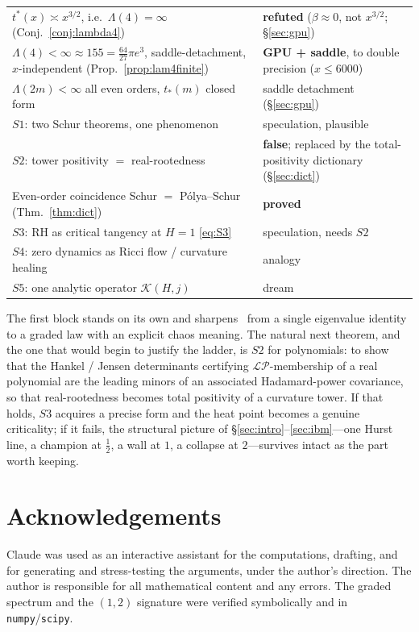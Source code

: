 \documentclass[11pt,reqno]{amsart}
\theoremstyle{plain}
\theoremstyle{definition}
\theoremstyle{remark}
\newcommand{\LP}{\mathcal{LP}}
\begin{document}
\begin{center}
\begin{tabular}{p{}l}
$t^\ast(x)\asymp x^{3/2}$, i.e.\ $\Lambda(4)=\infty$
(Conj.~\ref{conj:lambda4}) & \textbf{refuted} ($\beta\approx0$, not
$x^{3/2}$; \S\ref{sec:gpu})\\
$\Lambda(4)<\infty\approx155=\tfrac{64}{27}\pi e^3$, saddle-detachment,
$x$-independent (Prop.~\ref{prop:lam4finite}) & \textbf{GPU + saddle},
to double precision ($x\le6000$)\\
$\Lambda(2m)<\infty$ all even orders, $t_*(m)$ closed form & saddle
detachment (\S\ref{sec:gpu})\\
$S1$: two Schur theorems, one phenomenon & speculation, plausible\\
$S2$: tower positivity $=$ real-rootedness & \textbf{false}; replaced by
the total-positivity dictionary (\S\ref{sec:dict})\\
Even-order coincidence Schur $=$ P\'olya--Schur (Thm.~\ref{thm:dict}) &
\textbf{proved}\\
$S3$: RH as critical tangency at $H=1$ \eqref{eq:S3} & speculation,
needs $S2$\\
$S4$: zero dynamics as Ricci flow / curvature healing & analogy\\
$S5$: one analytic operator $\mathcal K(H,j)$ & dream\\
\hline
\end{tabular}
\end{center}

The first block stands on its own and sharpens~\cite{FontesBE} from a
single eigenvalue identity to a graded law with an explicit chaos
meaning. The natural next theorem, and the one that would begin to
justify the ladder, is $S2$ for polynomials: to show that the Hankel /
Jensen determinants certifying $\LP$-membership of a real polynomial
are the leading minors of an associated Hadamard-power covariance, so
that real-rootedness becomes total positivity of a curvature tower. If
that holds, $S3$ acquires a precise form and the heat point becomes a
genuine criticality; if it fails, the structural picture of
\S\ref{sec:intro}--\ref{sec:ibm}---one Hurst line, a champion at
$\tfrac12$, a wall at $1$, a collapse at $2$---survives intact as the
part worth keeping.

\section*{Acknowledgements}
Claude was used as an interactive assistant for the computations,
drafting, and for generating and stress-testing the arguments, under
the author's direction. The author is responsible for all mathematical
content and any errors. The graded spectrum and the $(1,2)$ signature
were verified symbolically and in \texttt{numpy}/\texttt{scipy}.
\end{document}

